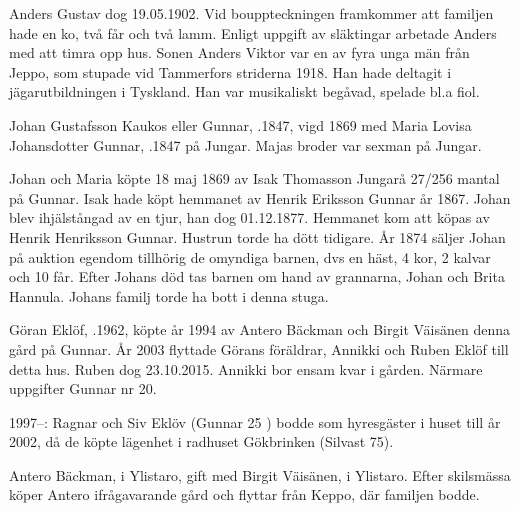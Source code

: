 Anders Gustav dog 19.05.1902. Vid bouppteckningen framkommer att familjen hade en ko, två får och två lamm. Enligt uppgift av släktingar arbetade Anders med att timra opp hus. Sonen Anders Viktor var en av fyra unga män från Jeppo, som stupade vid Tammerfors striderna 1918. Han hade deltagit i jägarutbildningen i Tyskland. Han var musikaliskt begåvad, spelade bl.a fiol.


%
Johan Gustafsson Kaukos eller Gunnar, .1847, vigd 1869 med Maria Lovisa Johansdotter Gunnar, .1847 på Jungar. Majas broder var sexman på Jungar.
\begin{jhchildren}
  \item {}
  \item {}
  \item {}
\end{jhchildren}

Johan och Maria köpte 18 maj 1869 av Isak Thomasson Jungarå 27/256 mantal på Gunnar. Isak hade köpt hemmanet av Henrik Eriksson Gunnar år 1867. Johan blev ihjälstångad av en tjur, han dog 01.12.1877. Hemmanet kom att köpas av Henrik Henriksson Gunnar. Hustrun torde ha dött tidigare. År 1874 säljer Johan på auktion egendom tillhörig de omyndiga barnen, dvs en häst, 4 kor, 2 kalvar och 10 får. Efter Johans död tas barnen om hand av grannarna, Johan och Brita Hannula. Johans familj torde ha bott i denna stuga.



%



%
Göran Eklöf, .1962, köpte år 1994 av Antero Bäckman  och Birgit Väisänen denna gård på Gunnar. År 2003 flyttade Görans föräldrar, Annikki och Ruben Eklöf till detta hus. Ruben dog 23.10.2015. Annikki bor ensam kvar i gården. Närmare uppgifter Gunnar nr 20.

1997--: Ragnar och Siv Eklöv (Gunnar 25 ) bodde som hyresgäster i huset till år 2002, då de köpte lägenhet i radhuset Gökbrinken (Silvast 75).


%
Antero Bäckman,  i Ylistaro, gift med Birgit Väisänen,  i Ylistaro. Efter skilsmässa köper Antero ifrågavarande gård och flyttar från Keppo, där familjen bodde.
\begin{jhchildren}
  \item {}
  \item {}
\end{jhchildren}


